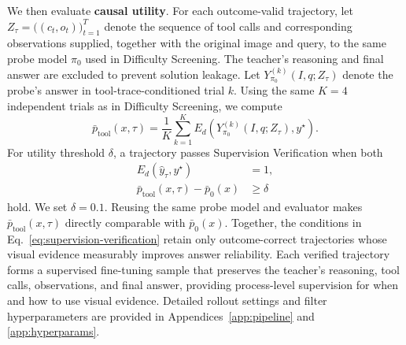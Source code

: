We then evaluate \textbf{causal utility}. 
For each outcome-valid trajectory, let $Z_\tau=\bigl((c_t,o_t)\bigr)_{t=1}^{T}$ denote the sequence of tool calls and corresponding observations supplied, together with the original image and query, to the same probe model $\pi_0$ used in Difficulty Screening.
The teacher's reasoning and final answer are excluded to prevent solution leakage. 
Let $Y_{\pi_0}^{(k)}(I,q;Z_\tau)$ denote the probe's answer in tool-trace-conditioned trial $k$.
Using the same $K=4$ independent trials as in Difficulty Screening, we compute
\begin{equation}
\bar{p}_{\mathrm{tool}}(x,\tau)=\frac{1}{K}\sum_{k=1}^{K}E_d\left(Y_{\pi_0}^{(k)}(I,q;Z_\tau),y^\star
\right).
\label{eq:tool-trace-success-rate}
\end{equation}
For utility threshold $\delta$, a trajectory passes Supervision Verification when both
\begin{equation}
\begin{aligned}
E_d(\hat{y}_\tau,y^\star) &= 1, \\
\bar{p}_{\mathrm{tool}}(x,\tau)-\bar{p}_0(x) &\geq \delta
\end{aligned}
\label{eq:supervision-verification}
\end{equation}
hold.
We set $\delta=0.1$. 
Reusing the same probe model and evaluator makes $\bar{p}_{\mathrm{tool}}(x,\tau)$ directly comparable with $\bar{p}_0(x)$.
Together, the conditions in Eq.~\ref{eq:supervision-verification} retain only outcome-correct trajectories whose visual evidence measurably improves answer reliability.
Each verified trajectory forms a supervised fine-tuning sample that preserves the teacher's reasoning, tool calls, observations, and final answer, providing process-level supervision for when and how to use visual evidence.
Detailed rollout settings and filter hyperparameters are provided in Appendices~\ref{app:pipeline} and \ref{app:hyperparams}.
